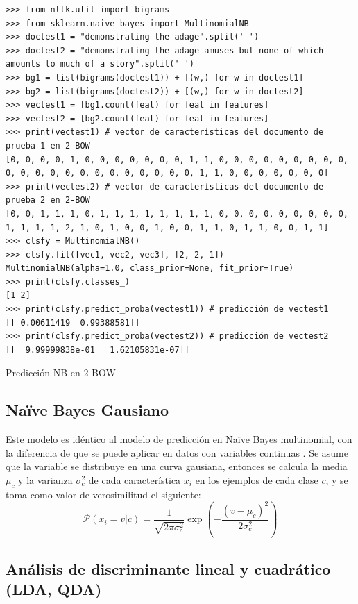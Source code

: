 \begin{listing}[htbp]
\begin{verbatim}
>>> from nltk.util import bigrams
>>> from sklearn.naive_bayes import MultinomialNB 
>>> doctest1 = "demonstrating the adage".split(' ')
>>> doctest2 = "demonstrating the adage amuses but none of which amounts to much of a story".split(' ')
>>> bg1 = list(bigrams(doctest1)) + [(w,) for w in doctest1]
>>> bg2 = list(bigrams(doctest2)) + [(w,) for w in doctest2]
>>> vectest1 = [bg1.count(feat) for feat in features]
>>> vectest2 = [bg2.count(feat) for feat in features]
>>> print(vectest1) # vector de características del documento de prueba 1 en 2-BOW
[0, 0, 0, 0, 1, 0, 0, 0, 0, 0, 0, 0, 1, 1, 0, 0, 0, 0, 0, 0, 0, 0, 0, 0, 0, 0, 0, 0, 0, 0, 0, 0, 0, 0, 0, 0, 1, 1, 0, 0, 0, 0, 0, 0, 0]
>>> print(vectest2) # vector de características del documento de prueba 2 en 2-BOW
[0, 0, 1, 1, 1, 0, 1, 1, 1, 1, 1, 1, 1, 1, 0, 0, 0, 0, 0, 0, 0, 0, 0, 1, 1, 1, 1, 2, 1, 0, 1, 0, 0, 1, 0, 0, 1, 1, 0, 1, 1, 0, 0, 1, 1]
>>> clsfy = MultinomialNB()
>>> clsfy.fit([vec1, vec2, vec3], [2, 2, 1])
MultinomialNB(alpha=1.0, class_prior=None, fit_prior=True)
>>> print(clsfy.classes_)
[1 2]
>>> print(clsfy.predict_proba(vectest1)) # predicción de vectest1
[[ 0.00611419  0.99388581]]
>>> print(clsfy.predict_proba(vectest2)) # predicción de vectest2
[[  9.99999838e-01   1.62105831e-07]]
\end{verbatim}
\caption{Predicción NB en 2-BOW}
\label{lst:multinb-2bow}
\end{listing}

\subsection{Naïve Bayes Gausiano}

Este modelo es idéntico al modelo de predicción en Naïve Bayes multinomial, con la diferencia de que se puede aplicar en datos con variables continuas \citep[Naive Bayes classifier]{wikipedia-es}. Se asume que la variable se distribuye en una curva gausiana, entonces se calcula la media $\mu_c$ y la varianza $\sigma^2_c$ de cada característica $x_i$ en los ejemplos de cada clase $c$, y se toma como valor de verosimilitud el siguiente:
\begin{equation}
\mathcal{P}(x_i=v|c) = \frac{1}{\sqrt{2\pi\sigma^2_c}}\exp\left(-\frac{(v-\mu_c)^2}{2\sigma^2_c}\right)
\end{equation}

\subsection{Análisis de discriminante lineal y cuadrático (LDA, QDA)}

